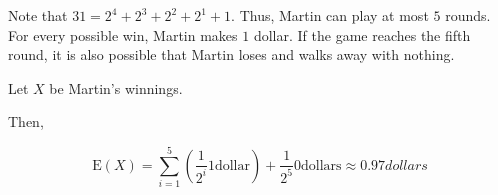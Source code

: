 Note that $31 = 2^{4} + 2^{3} + 2^{2} + 2^{1} + 1$. Thus, Martin can play at
most $5$ rounds. For every possible win, Martin makes $1$ dollar. If the game
reaches the fifth round, it is also possible that Martin loses and walks away
with nothing.

Let $X$ be Martin's winnings.

Then,

$$\text{E}(X) = \sum_{i=1}^{5}(\frac{1}{2^{i}} 1 \text{dollar}) + \frac{1}{2^{5}}
0 \text{dollars} \approx 0.97 {dollars}$$  